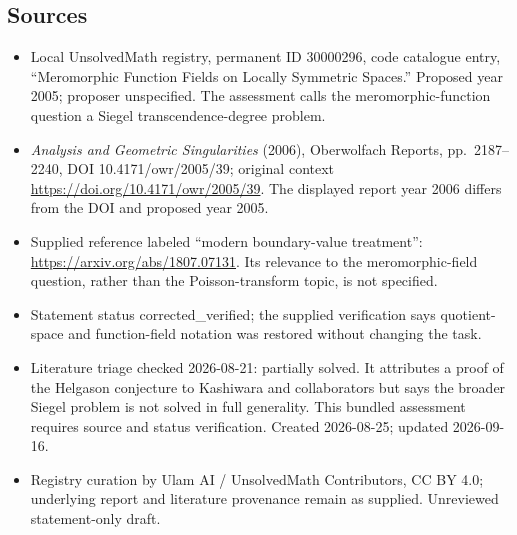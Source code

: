 \documentclass[11pt]{article}
\begin{document}
\subsection{Sources}
\begin{itemize}
\item Local UnsolvedMath registry, permanent ID 30000296, code catalogue entry, ``Meromorphic Function Fields on Locally Symmetric Spaces.'' Proposed year 2005; proposer unspecified. The assessment calls the meromorphic-function question a Siegel transcendence-degree problem.
\item \emph{Analysis and Geometric Singularities} (2006), Oberwolfach Reports, pp.\ 2187--2240, DOI 10.4171/owr/2005/39; original context \url{https://doi.org/10.4171/owr/2005/39}. The displayed report year 2006 differs from the DOI and proposed year 2005.
\item Supplied reference labeled ``modern boundary-value treatment'': \url{https://arxiv.org/abs/1807.07131}. Its relevance to the meromorphic-field question, rather than the Poisson-transform topic, is not specified.
\item Statement status corrected\_verified; the supplied verification says quotient-space and function-field notation was restored without changing the task.
\item Literature triage checked 2026-08-21: partially solved. It attributes a proof of the Helgason conjecture to Kashiwara and collaborators but says the broader Siegel problem is not solved in full generality. This bundled assessment requires source and status verification. Created 2026-08-25; updated 2026-09-16.
\item Registry curation by Ulam AI / UnsolvedMath Contributors, CC BY 4.0; underlying report and literature provenance remain as supplied. Unreviewed statement-only draft.
\end{itemize}
\end{document}
